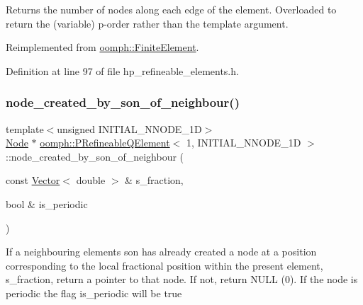 Returns the number of nodes along each edge of the element. Overloaded to return the (variable) p-\/order rather than the template argument. 



Reimplemented from \hyperlink{classoomph_1_1FiniteElement_ab65c7a94dda80c1876a09ac12be4e39c}{oomph\+::\+Finite\+Element}.



Definition at line 97 of file hp\+\_\+refineable\+\_\+elements.\+h.

\mbox{\label{classoomph_1_1PRefineableQElement_3_011_00_01INITIAL__NNODE__1D_01_4_af3075981884efbba63063b3adb1c2535}} 
\subsubsection{\texorpdfstring{node\+\_\+created\+\_\+by\+\_\+son\+\_\+of\+\_\+neighbour()}{node\_created\_by\_son\_of\_neighbour()}}
{\footnotesize\ttfamily template$<$unsigned I\+N\+I\+T\+I\+A\+L\+\_\+\+N\+N\+O\+D\+E\+\_\+1D$>$ \\
\hyperlink{classoomph_1_1Node}{Node} $\ast$ \hyperlink{classoomph_1_1PRefineableQElement}{oomph\+::\+P\+Refineable\+Q\+Element}$<$ 1, I\+N\+I\+T\+I\+A\+L\+\_\+\+N\+N\+O\+D\+E\+\_\+1D $>$\+::node\+\_\+created\+\_\+by\+\_\+son\+\_\+of\+\_\+neighbour (\begin{DoxyParamCaption}\item[{const \hyperlink{classoomph_1_1Vector}{Vector}$<$ double $>$ \&}]{s\+\_\+fraction,  }\item[{bool \&}]{is\+\_\+periodic }\end{DoxyParamCaption})}

If a neighbouring element\textquotesingle{}s son has already created a node at a position corresponding to the local fractional position within the present element, s\+\_\+fraction, return a pointer to that node. If not, return N\+U\+LL (0). If the node is periodic the flag is\+\_\+periodic will be true 

